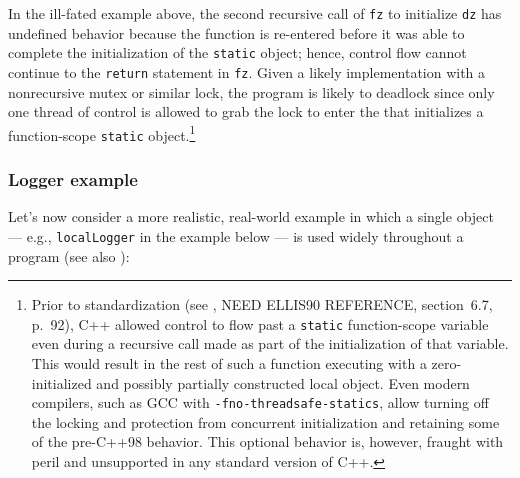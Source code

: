 \noindent In the ill-fated example above, the second recursive call of \lstinline!fz!
to initialize \lstinline!dz! has undefined behavior because the function is
re-entered before it was able to complete the initialization of the
\lstinline!static! object; hence, control flow cannot continue to the
\lstinline!return! statement in \lstinline!fz!. Given a likely implementation
with a nonrecursive mutex or similar lock, the program is likely to
deadlock
since only one thread of control is allowed to
grab the lock to enter the  that
initializes a function-scope \lstinline!static!
object.{\cprotect\footnote{Prior to standardization (see \cite{ellis90},
NEED ELLIS90 REFERENCE, section~6.7, p.~92), C++ allowed control to flow past a
\lstinline!static! function-scope variable even during a recursive call
made as part of the initialization of that variable. This would result
in the rest of such a function executing with a zero-initialized and
possibly partially constructed local object. Even modern compilers,
such as GCC with \lstinline!-fno-threadsafe-statics!, allow turning off
the locking and protection from concurrent initialization and
retaining some of the pre-C++98 behavior. This optional behavior is,
however, fraught with peril and unsupported in any standard version of
  C++.}}

\subsubsection[Logger example]{Logger example}\label{logger-example}

Let's now consider a more realistic,
real-world example in which a single object --- e.g.,
\lstinline!localLogger! in the example below --- is used widely throughout a program (see
also ):

